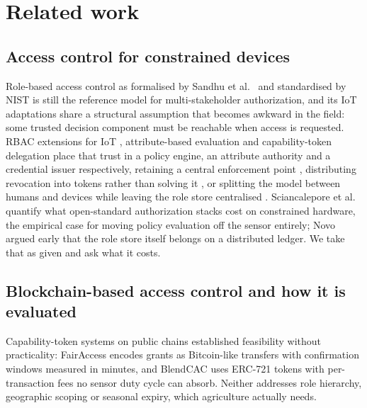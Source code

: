 \documentclass[a4paper,fleqn]{cas-sc}
\begin{document}
\section{Related work}
\label{sec:related}

\subsection{Access control for constrained devices}
\label{subsec:rw_models}

Role-based access control as formalised by Sandhu et al.\ \cite{sandhu1996role}
and standardised by NIST \cite{ferraiolo2001role} is still the reference
model for multi-stakeholder authorization, and its IoT adaptations share a
structural assumption that becomes awkward in the field: some trusted
decision component must be reachable when access is requested. RBAC
extensions for IoT \cite{ye2015iot}, attribute-based evaluation
\cite{hu2014guide,servos2017abac,sciancalepore2017oauth} and capability-token
delegation \cite{hernandez2017capability} place that trust in a policy
engine, an attribute authority and a credential issuer respectively,
retaining a central enforcement point \cite{ye2015iot,servos2017abac},
distributing revocation into tokens rather than solving it
\cite{hernandez2017capability}, or splitting the model between humans and
devices while leaving the role store centralised
\cite{alshehri2016access}. Sciancalepore et
al.\ \cite{sciancalepore2017oauth} quantify what open-standard authorization
stacks cost on constrained hardware, the empirical case for moving policy
evaluation off the sensor entirely; Novo \cite{novo2018blockchain} argued
early that the role store itself belongs on a distributed ledger. We take
that as given and ask what it costs.

\subsection{Blockchain-based access control and how it is evaluated}
\label{subsec:rw_blockchain}

Capability-token systems on public chains established feasibility without
practicality: FairAccess \cite{ouaddah2016fairaccess} encodes grants as
Bitcoin-like transfers with confirmation windows measured in minutes, and
BlendCAC \cite{xu2018blendcac} uses ERC-721 tokens with per-transaction fees
no sensor duty cycle can absorb. Neither addresses role hierarchy,
geographic scoping or seasonal expiry, which agriculture actually needs.
\end{document}
